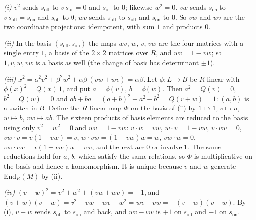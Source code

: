 \emph{(i)} $v^{2}$ sends $s_{\mathrm{off}}$ to $v\,s_{\mathrm{on}} = 0$ and $s_{\mathrm{on}}$ to $0$; likewise $w^{2} = 0$. $vw$ sends $s_{\mathrm{on}}$ to $v\,s_{\mathrm{off}} = s_{\mathrm{on}}$ and $s_{\mathrm{off}}$ to $0$; $wv$ sends $s_{\mathrm{off}}$ to $s_{\mathrm{off}}$ and $s_{\mathrm{on}}$ to $0$. So $vw$ and $wv$ are the two coordinate projections: idempotent, with sum $1$ and products $0$.

\emph{(ii)} In the basis $(s_{\mathrm{off}}, s_{\mathrm{on}})$ the maps $wv$, $w$, $v$, $vw$ are the four matrices with a single entry $1$, a basis of the $2 \times 2$ matrices over $R$, and $wv = 1 - vw$; so $1, v, w, vw$ is a basis as well (the change of basis has determinant $\pm 1$).

\emph{(iii)} $x^{2} = \alpha^{2}v^{2} + \beta^{2}w^{2} + \alpha\beta\,(vw + wv) = \alpha\beta$. Let $\phi : L \to B$ be $R$-linear with $\phi(x)^{2} = Q(x)\,1$, and put $a = \phi(v)$, $b = \phi(w)$. Then $a^{2} = Q(v) = 0$, $b^{2} = Q(w) = 0$ and $ab + ba = (a + b)^{2} - a^{2} - b^{2} = Q(v + w) = 1$: $(a, b)$ is a switch in $B$. Define the $R$-linear map $\Phi$ on the basis of (ii) by $1 \mapsto 1$, $v \mapsto a$, $w \mapsto b$, $vw \mapsto ab$. The sixteen products of basis elements are reduced to the basis using only $v^{2} = w^{2} = 0$ and $wv = 1 - vw$: $v \cdot w = vw$, $w \cdot v = 1 - vw$, $v \cdot vw = 0$, $vw \cdot v = v(1 - vw) = v$, $w \cdot vw = (1 - vw)w = w$, $vw \cdot w = 0$, $vw \cdot vw = v(1 - vw)w = vw$, and the rest are $0$ or involve $1$. The same reductions hold for $a$, $b$, which satisfy the same relations, so $\Phi$ is multiplicative on the basis and hence a homomorphism. It is unique because $v$ and $w$ generate $\mathrm{End}_{R}(M)$ by (ii).

\emph{(iv)} $(v \pm w)^{2} = v^{2} + w^{2} \pm (vw + wv) = \pm 1$, and $(v + w)(v - w) = v^{2} - vw + wv - w^{2} = wv - vw = -(v - w)(v + w)$. By (i), $v + w$ sends $s_{\mathrm{off}}$ to $s_{\mathrm{on}}$ and back, and $wv - vw$ is $+1$ on $s_{\mathrm{off}}$ and $-1$ on $s_{\mathrm{on}}$.
